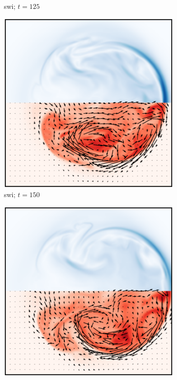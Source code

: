 \begin{figure}[t]
\begin{subfigure}[t]{0.32\textwidth}
    \caption{swi; $t=125$}
    \label{fig:final_switching_current_density_0025}
  \end{subfigure}
  \hfill
  \begin{subfigure}[t]{0.32\textwidth}
    \centering
    \includegraphics[width=\linewidth]{slices/final_switching_current_density_0030.pdf}
    \caption{swi; $t=150$}
    \label{fig:final_switching_current_density_0030}
  \end{subfigure}
  \hfill
  \begin{subfigure}[t]{0.32\textwidth}
    \centering
    \includegraphics[width=\linewidth]{slices/final_switching_current_density_0035.pdf}

\end{subfigure}
\end{figure}
